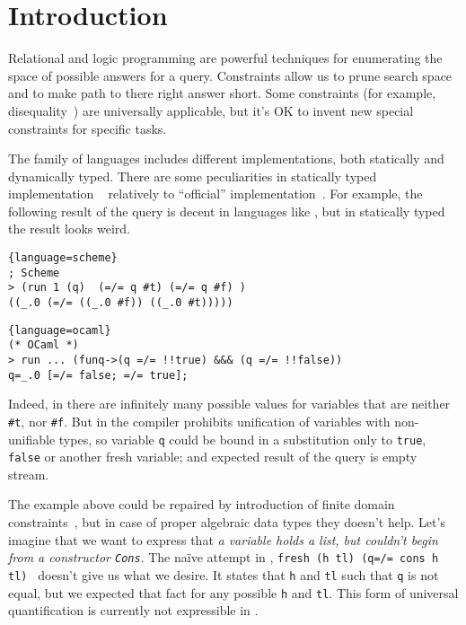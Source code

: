 \section{Introduction}
\label{sec:intro}

Relational and logic programming are powerful techniques for enumerating the space of possible answers for a query. Constraints allow us to prune search space and to make path to there right answer short. Some constraints (for example, disequality~\cite{WillThesis}) are universally applicable, but it's OK to invent new special constraints for specific tasks.

The \miniKanren{} family of languages includes different implementations, both statically and dynamically typed. There are some peculiarities in statically typed implementation \OCanren{}~\cite{ocanren} relatively to ``official'' implementation~\cite{fasterMK}. For example, the following result of the query is decent in languages like
\Scheme{}, but in statically typed \OCaml{} the result looks weird.

\begin{minipage}{7cm}
\begin{lstlisting}{language=scheme}
; Scheme
> (run 1 (q)  (=/= q #t) (=/= q #f) )
((_.0 (=/= ((_.0 #f)) ((_.0 #t)))))
\end{lstlisting}
\end{minipage}

\begin{minipage}{9.5cm}
\begin{lstlisting}{language=ocaml}
(* OCaml *)
> run ... (funq->(q =/= !!true) &&& (q =/= !!false))
q=_.0 [=/= false; =/= true];
\end{lstlisting}
\end{minipage}

\noindent Indeed, in \Scheme{} there are infinitely many possible values for variables that are neither \lstinline[]=#t=, nor
\lstinline[]=#f=. But in \OCanren{} the compiler prohibits unification of variables with non-unifiable types, so variable \verb=q= could be bound in a substitution only to \lstinline=true=, \lstinline=false= or another fresh variable; and expected result of the query is empty stream.

The example above could be repaired by introduction of finite domain constraints~\cite{cKanren}, but in case of proper algebraic data types they doesn't help. Let's imagine that we want to express that \emph{a variable holds a list, but couldn't begin from a constructor \lstinline=Cons=}. The na\"{i}ve attempt in \OCanren{}, \lstinline|fresh (h tl) (q=/= cons h tl) | doesn't give us what we desire. It states that  \lstinline|h| and \lstinline|tl| such that \lstinline|q| is not equal, but we expected that fact for any possible \lstinline|h| and \lstinline|tl|. This form of universal quantification is currently not expressible in \OCanren{}.

